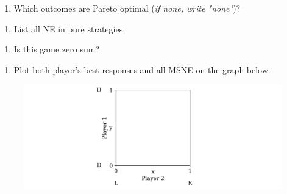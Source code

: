 \documentclass[11pt]{article}
\begin{document}
\begin{enumerate}[label=\alph*), start=1]
\item  Which outcomes are Pareto optimal (\textit{if none, write "none"})? \hfill \raisebox{-1ex}{\rule{4.2cm}{1pt}}

\end{enumerate}
\begin{enumerate}[label=\alph*), start=2]
\item  List all NE in pure strategies. \hfill \raisebox{-1ex}{\rule{4.2cm}{1pt}}

\end{enumerate}
\begin{enumerate}[label=\alph*), start=3]
\item  Is this game zero sum? \hfill \raisebox{-1ex}{\rule{4.2cm}{1pt}}

\end{enumerate}
\begin{enumerate}[label=\alph*), start=4]
\item  Plot both player’s best responses and all MSNE on the graph below.

\end{enumerate}

\begin{figure}[h!]
\centering
\includegraphics[width=\textwidth]{Images/mixed_strategy_graph.png}
\end{figure}
\end{document}
